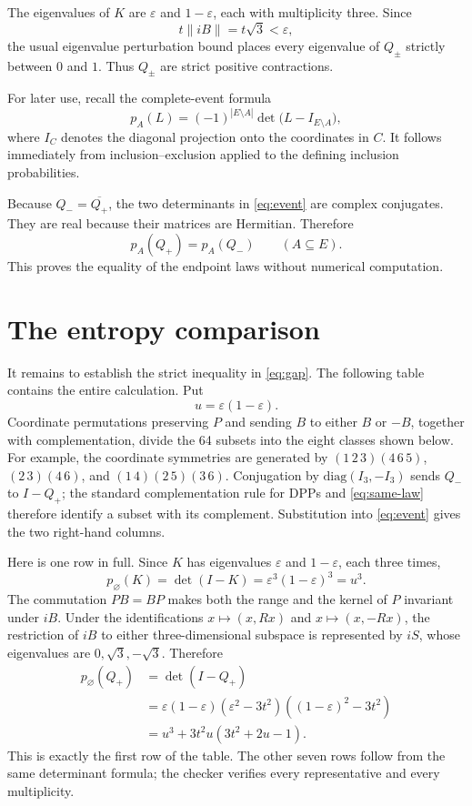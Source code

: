 \documentclass[11pt]{article}
\begin{document}
The eigenvalues of $K$ are $\varepsilon$ and $1-\varepsilon$, each with
multiplicity three.  Since
\[
 t\lVert iB\rVert=t\sqrt3<\varepsilon,
\]
the usual eigenvalue perturbation bound places every eigenvalue of $Q_\pm$
strictly between $0$ and $1$.  Thus $Q_\pm$ are strict positive
contractions.

For later use, recall the complete-event formula
\begin{equation}\label{eq:event}
 p_A(L)=(-1)^{|E\setminus A|}
 \det\bigl(L-I_{E\setminus A}\bigr),
\end{equation}
where $I_C$ denotes the diagonal projection onto the coordinates in $C$.
It follows immediately from inclusion--exclusion applied to the defining
inclusion probabilities.

Because $Q_-=\overline{Q_+}$, the two determinants in \eqref{eq:event} are
complex conjugates.  They are real because their matrices are Hermitian.
Therefore
\begin{equation}\label{eq:same-law}
 p_A(Q_+)=p_A(Q_-)\qquad(A\subseteq E).
\end{equation}
This proves the equality of the endpoint laws without numerical computation.

\section{The entropy comparison}

It remains to establish the strict inequality in \eqref{eq:gap}.  The following
table contains the entire calculation.  Put
\[
 u=\varepsilon(1-\varepsilon).
\]
Coordinate permutations preserving $P$ and sending $B$ to either $B$ or
$-B$, together with complementation, divide the 64 subsets into the eight
classes shown below.  For example, the coordinate symmetries are generated by
$(1\,2\,3)(4\,6\,5)$, $(2\,3)(4\,6)$, and
$(1\,4)(2\,5)(3\,6)$.  Conjugation by
$\mathrm{diag}(I_3,-I_3)$ sends $Q_-$ to $I-Q_+$; the standard
complementation rule for DPPs and \eqref{eq:same-law} therefore identify a
subset with its complement.  Substitution into \eqref{eq:event} gives the two
right-hand columns.

Here is one row in full.  Since $K$ has eigenvalues $\varepsilon$ and
$1-\varepsilon$, each three times,
\[
 p_{\varnothing}(K)=\det(I-K)
 =\varepsilon^3(1-\varepsilon)^3=u^3.
\]
The commutation $PB=BP$ makes both the range and the kernel of $P$ invariant
under $iB$.  Under the identifications
$x\mapsto(x,Rx)$ and $x\mapsto(x,-Rx)$, the restriction of $iB$ to either
three-dimensional subspace is represented by $iS$, whose eigenvalues are
$0,\sqrt3,-\sqrt3$.  Therefore
\begin{align*}
 p_{\varnothing}(Q_+)
 &=\det(I-Q_+)\\
 &=\varepsilon(1-\varepsilon)
   (\varepsilon^2-3t^2)((1-\varepsilon)^2-3t^2)\\
 &=u^3+3t^2u(3t^2+2u-1).
\end{align*}
This is exactly the first row of the table.  The other seven rows follow from
the same determinant formula; the checker verifies every representative and
every multiplicity.
\end{document}
